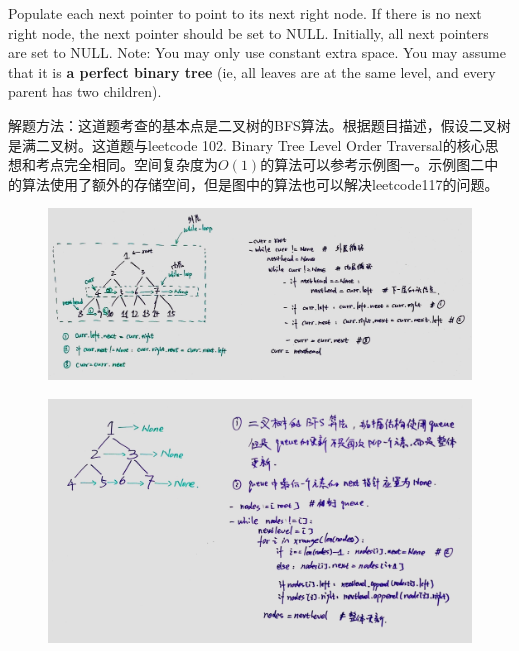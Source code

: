 \documentclass[a4paper,10pt]{article}
\begin{document}
\noindent Populate each next pointer to point to its next right node. If there is no next right node, the next pointer should be set to NULL. Initially, all next pointers are set to NULL. Note: You may only use constant extra space. You may assume that it is \textbf{a perfect binary tree} (ie, all leaves are at the same level, and every parent has two children). \\

\begin{CJK*}{UTF8}{gbsn}
\noindent 解题方法：这道题考查的基本点是二叉树的BFS算法。根据题目描述，假设二叉树是满二叉树。这道题与leetcode 102. Binary Tree Level Order Traversal的核心思想和考点完全相同。空间复杂度为$O(1)$的算法可以参考示例图一。示例图二中的算法使用了额外的存储空间，但是图中的算法也可以解决leetcode117的问题。
\end{CJK*}

\begin{figure}[h]
    \includegraphics[width=\textwidth]{leetcode116-2.jpg}
    \centering
\end{figure}

\begin{figure}[h]
    \includegraphics[width=\textwidth]{leetcode116.jpg}
    \centering \\
\end{figure}
\end{document}
